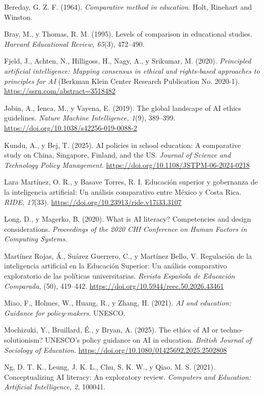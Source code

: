 \documentclass[12pt,letterpaper]{article}
\begin{document}
\begin{sloppypar}\setlength{\parindent}{0pt}\setlength{\parskip}{6pt}\small

Bereday, G. Z. F. (1964). \textit{Comparative method in education}. Holt, Rinehart and Winston.

Bray, M., y Thomas, R. M. (1995). Levels of comparison in educational studies. \textit{Harvard
Educational Review, 65}(3), 472--490.

Fjeld, J., Achten, N., Hilligoss, H., Nagy, A., y Srikumar, M. (2020). \textit{Principled
artificial intelligence: Mapping consensus in ethical and rights-based approaches to principles
for AI} (Berkman Klein Center Research Publication No. 2020-1). \url{https://ssrn.com/abstract=3518482}

Jobin, A., Ienca, M., y Vayena, E. (2019). The global landscape of AI ethics guidelines.
\textit{Nature Machine Intelligence, 1}(9), 389--399. \url{https://doi.org/10.1038/s42256-019-0088-2}

Kundu, A., y Bej, T. (2025). AI policies in school education: A comparative study on China,
Singapore, Finland, and the US. \textit{Journal of Science and Technology Policy Management}.
\url{https://doi.org/10.1108/JSTPM-06-2024-0218}

Lara Martínez, O. R., y Basave Torres, R. I. Educación superior y gobernanza de la inteligencia
artificial: Un análisis comparativo entre México y Costa Rica. \textit{RIDE, 17}(33).
\url{https://doi.org/10.23913/ride.v17i33.3107}

Long, D., y Magerko, B. (2020). What is AI literacy? Competencies and design considerations.
\textit{Proceedings of the 2020 CHI Conference on Human Factors in Computing Systems}.

Martínez Rojas, Á., Suárez Guerrero, C., y Martínez Bello, V. Regulación de la inteligencia
artificial en la Educación Superior: Un análisis comparativo exploratorio de las políticas
universitarias. \textit{Revista Española de Educación Comparada}, (50), 419--442.
\url{https://doi.org/10.5944/reec.50.2026.43461}

Miao, F., Holmes, W., Huang, R., y Zhang, H. (2021). \textit{AI and education: Guidance for
policy-makers}. UNESCO.

Mochizuki, Y., Bruillard, É., y Bryan, A. (2025). The ethics of AI or techno-solutionism?
UNESCO's policy guidance on AI in education. \textit{British Journal of Sociology of Education}.
\url{https://doi.org/10.1080/01425692.2025.2502808}

Ng, D. T. K., Leung, J. K. L., Chu, S. K. W., y Qiao, M. S. (2021). Conceptualizing AI literacy:
An exploratory review. \textit{Computers and Education: Artificial Intelligence, 2}, 100041.


\end{sloppypar}
\end{document}
